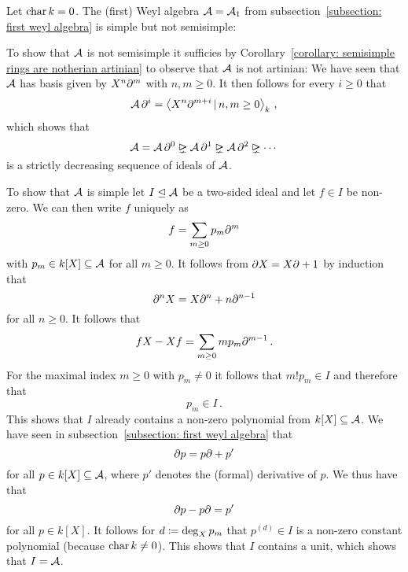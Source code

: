 \begin{example}
  \label{example: simple but not semisimple}
  Let $\operatorname{char} k = 0$.
  The (first) Weyl algebra $\operatorname{\mathcal{A}} = \operatorname{\mathcal{A}}_1$ from subsection~\ref{subsection: first weyl algebra} is simple but not semisimple:
  
  To show that $\operatorname{\mathcal{A}}$ is not semisimple it sufficies by Corollary~\ref{corollary: semisimple rings are notherian artinian} to observe that $\operatorname{\mathcal{A}}$ is not artinian:
  We have seen that $\operatorname{\mathcal{A}}$ has basis given by $X^n \partial^m$ with $n, m \geq 0$.
  It then follows for every $i \geq 0$ that
  \[
      \weyl \del^i
    = \gen{ X^n \del^{m+i} \suchthat n, m \geq 0 }_k \,,
  \]
  which shows that
  \[
                \weyl
    =           \weyl \del^0
    \idealgneq  \weyl \del^1
    \idealgneq  \weyl \del^2
    \idealgneq  \dotsb
  \]
  is a strictly decreasing sequence of ideals of $\operatorname{\mathcal{A}}$.
  
  To show that $\operatorname{\mathcal{A}}$ is simple let $I \trianglelefteq \operatorname{\mathcal{A}}$ be a two-sided ideal and let $f \in I$ be non-zero.
  We can then write $f$ uniquely as
  \[
      f
    = \sum_{m \geq 0} p_m \partial^m
  \]
  with $p_m \in k[X] \subseteq \operatorname{\mathcal{A}}$ for all $m \geq 0$.
  It follows from $\partial X = X \partial + 1$ by induction that 
  \[
      \partial^n X
    = X \partial^n + n \partial^{n-1}
  \]
  for all $n \geq 0$.
  It follows that
  \[
      f X - X f
    = \sum_{m \geq 0} m p_m \partial^{m-1} \,.
  \]
  For the maximal index $m \geq 0$ with $p_m \neq 0$ it follows that $m! p_m \in I$ and therefore that
  \[
    p_m \in I \,.
  \]
  This shows that $I$ already contains a non-zero polynomial from $k[X] \subseteq \operatorname{\mathcal{A}}$.
  We have seen in subsection~\ref{subsection: first weyl algebra} that
  \[
    \partial p = p \partial + p'
  \]
  for all $p \in k[X] \subseteq \operatorname{\mathcal{A}}$, where $p'$ denotes the (formal) derivative of $p$.
  We thus have that
  \[
      \partial p - p \partial
    = p'
  \]
  for all $p \in k[X]$.
  It follows for $d \coloneqq \deg_X p_m$ that $p^{(d)} \in I$ is a non-zero constant polynomial (because $\operatorname{char} k \neq 0$).
  This shows that $I$ contains a unit, which shows that $I = \operatorname{\mathcal{A}}$.
\end{example}


